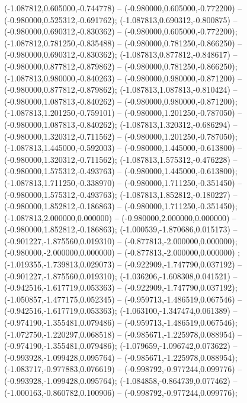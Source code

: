  (-1.087812,0.605000,-0.744778) -- (-0.980000,0.605000,-0.772200) -- (-0.980000,0.525312,-0.691762);
 (-1.087813,0.690312,-0.800875) -- (-0.980000,0.690312,-0.830362) -- (-0.980000,0.605000,-0.772200);
 (-1.087812,0.781250,-0.835488) -- (-0.980000,0.781250,-0.866250) -- (-0.980000,0.690312,-0.830362);
 (-1.087813,0.877812,-0.848617) -- (-0.980000,0.877812,-0.879862) -- (-0.980000,0.781250,-0.866250);
 (-1.087813,0.980000,-0.840263) -- (-0.980000,0.980000,-0.871200) -- (-0.980000,0.877812,-0.879862);
 (-1.087813,1.087813,-0.810424) -- (-0.980000,1.087813,-0.840262) -- (-0.980000,0.980000,-0.871200);
 (-1.087813,1.201250,-0.759101) -- (-0.980000,1.201250,-0.787050) -- (-0.980000,1.087813,-0.840262);
 (-1.087813,1.320312,-0.686294) -- (-0.980000,1.320312,-0.711562) -- (-0.980000,1.201250,-0.787050);
 (-1.087813,1.445000,-0.592003) -- (-0.980000,1.445000,-0.613800) -- (-0.980000,1.320312,-0.711562);
 (-1.087813,1.575312,-0.476228) -- (-0.980000,1.575312,-0.493763) -- (-0.980000,1.445000,-0.613800);
 (-1.087813,1.711250,-0.338970) -- (-0.980000,1.711250,-0.351450) -- (-0.980000,1.575312,-0.493763);
 (-1.087813,1.852812,-0.180227) -- (-0.980000,1.852812,-0.186863) -- (-0.980000,1.711250,-0.351450);
 (-1.087813,2.000000,0.000000) -- (-0.980000,2.000000,0.000000) -- (-0.980000,1.852812,-0.186863);
 (-1.000539,-1.870686,0.015173) -- (-0.901227,-1.875560,0.019310) -- (-0.877813,-2.000000,0.000000);
 (-0.980000,-2.000000,0.000000) -- (-0.877813,-2.000000,0.000000) ;
 (-1.019355,-1.739813,0.029073) -- (-0.922909,-1.747790,0.037192) -- (-0.901227,-1.875560,0.019310);
 (-1.036206,-1.608308,0.041521) -- (-0.942516,-1.617719,0.053363) -- (-0.922909,-1.747790,0.037192);
 (-1.050857,-1.477175,0.052345) -- (-0.959713,-1.486519,0.067546) -- (-0.942516,-1.617719,0.053363);
 (-1.063100,-1.347474,0.061389) -- (-0.974190,-1.355481,0.079486) -- (-0.959713,-1.486519,0.067546);
 (-1.072750,-1.220297,0.068518) -- (-0.985671,-1.225978,0.088954) -- (-0.974190,-1.355481,0.079486);
 (-1.079659,-1.096742,0.073622) -- (-0.993928,-1.099428,0.095764) -- (-0.985671,-1.225978,0.088954);
 (-1.083717,-0.977883,0.076619) -- (-0.998792,-0.977244,0.099776) -- (-0.993928,-1.099428,0.095764);
 (-1.084858,-0.864739,0.077462) -- (-1.000163,-0.860782,0.100906) -- (-0.998792,-0.977244,0.099776);
